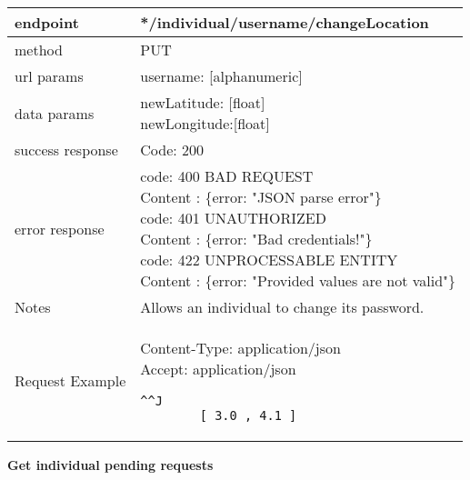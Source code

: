 \begin{tabularx}{\linewidth}{| l| l }
	\hline
	endpoint & */individual/{username}/changeLocation \\
	\hline
	method & PUT \\
	\hline
	url params & 
	\parbox{0.7\textwidth}{
		\bigskip
		username: [alphanumeric]
		\bigskip
	}\\
	\hline
	data params & 
	\parbox{0.7\textwidth}{
		\bigskip
		newLatitude: [float]\\
		newLongitude:[float]
		\bigskip
	} \\
	\hline
	success response &
	\parbox{0.7\textwidth}{
		\bigskip
		Code: 200
		\bigskip
	} \\
	\hline
	error response &
	\parbox{0.7\textwidth}{
		\bigskip
		code: 400 BAD REQUEST \\
		Content : \{error: "JSON parse error"\}\\
		code: 401 UNAUTHORIZED \\
		Content : \{error: "Bad credentials!"\}\\
		code: 422 UNPROCESSABLE ENTITY\\
		Content : \{error: "Provided values are not valid"\}
		\bigskip
	} \\
	\hline
	Notes & \parbox{0.7\textwidth}{
		\bigskip
		Allows an individual to change its password.
		\bigskip
	} \\
	\hline
	Request Example & 
		\parbox{0.8\textwidth}{
		\bigskip
		Content-Type: application/json \\
		Accept: application/json \\
		\bigskip
		\begin{lstlisting}^^J
		[ 3.0 , 4.1 ]
		\end{lstlisting}
	} \\
		\hline
\end{tabularx}

\textbf{Get individual pending requests} \\

